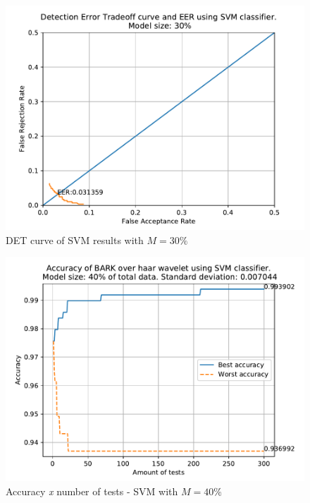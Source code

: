 	\begin{figure}[H]
		\centering
		\includegraphics[scale=.8]{images/results/det/DET_for_classifier_SVM_30.pdf}
		\caption{DET curve of SVM results with $M=30\%$}
		\label{fig:detsvm30}
	\end{figure}
	\begin{figure}[H]
		\centering
		\includegraphics[scale=.8]{images/results/confusionMatrices/classifier_SVM_40.pdf}
		\caption{Accuracy \textit{x} number of tests - SVM with $M=40\%$}
		\label{fig:classifiersvm40}
	\end{figure}

